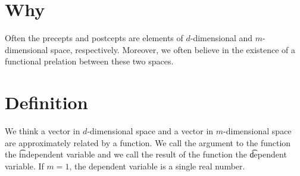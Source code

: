

\section*{Why}

Often the precepts and postcepts are elements of $d$-dimensional and $m$-dimensional space, respectively.
Moreover, we often believe in the existence of a functional prelation between these two spaces.

\section*{Definition}

We think a vector in $d$-dimensional space and a vector in $m$-dimensional space are approximately related by a function.
We call the argument to the function the \t{independent variable} and we call the result of the function the \t{dependent variable}.
If $m = 1$, the dependent variable is a single real number.

\blankpage